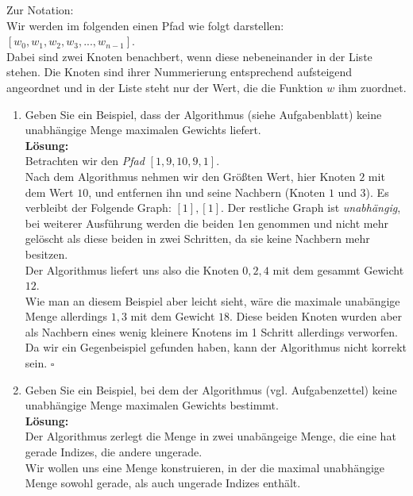 \documentclass[11pt,a4paper,ngerman]{article}
\begin{document}
Zur Notation:\\
Wir werden im folgenden einen Pfad wie folgt darstellen:\\
$[w_0, w_1, w_2, w_3 , ... , w_{n-1}]$.\\
Dabei sind zwei Knoten benachbert, wenn diese nebeneinander in der Liste stehen. Die Knoten sind ihrer Nummerierung entsprechend aufsteigend angeordnet und in der Liste steht nur der Wert, die die Funktion $w$ ihm zuordnet.
\begin{enumerate}[\bfseries (a)]


\item Geben Sie ein Beispiel, dass der Algorithmus (siehe Aufgabenblatt) keine unabhängige Menge maximalen Gewichts liefert.\\

\textbf{Lösung:}\\
Betrachten wir den \emph{Pfad} $[1, 9 , 10 , 9 , 1]$.\\

Nach dem Algorithmus nehmen wir den Größten Wert, hier Knoten $2$ mit dem Wert $10$, und entfernen ihn und seine Nachbern (Knoten $1$ und $3$). Es verbleibt der Folgende Graph: $[1], [1]$. Der restliche Graph ist \emph{unabhängig}, bei weiterer Ausführung werden die beiden 1en genommen und nicht mehr gelöscht als diese beiden in zwei Schritten, da sie keine Nachbern mehr besitzen.\\

Der Algorithmus liefert uns also die Knoten $0,2,4$ mit dem gesammt Gewicht $12$.\\
Wie man an diesem Beispiel aber leicht sieht, wäre die maximale unabängige Menge allerdings $1,3$ mit dem Gewicht $18$. Diese beiden Knoten wurden aber als Nachbern eines wenig kleinere Knotens im 1 Schritt allerdings verworfen.\\

Da wir ein Gegenbeispiel gefunden haben, kann der Algorithmus nicht korrekt sein. \mbox{} \hfill $\square$


\item Geben Sie ein Beispiel, bei dem der Algorithmus (vgl. Aufgabenzettel) keine unabhängige Menge maximalen Gewichts bestimmt.\\

\textbf{Lösung:}\\
Der Algorithmus zerlegt die Menge in zwei unabängeige Menge, die eine hat gerade Indizes, die andere ungerade.\\
Wir wollen uns eine Menge konstruieren, in der die maximal unabhängige Menge sowohl gerade, als auch ungerade Indizes enthält.\\


\end{enumerate}
\end{document}
